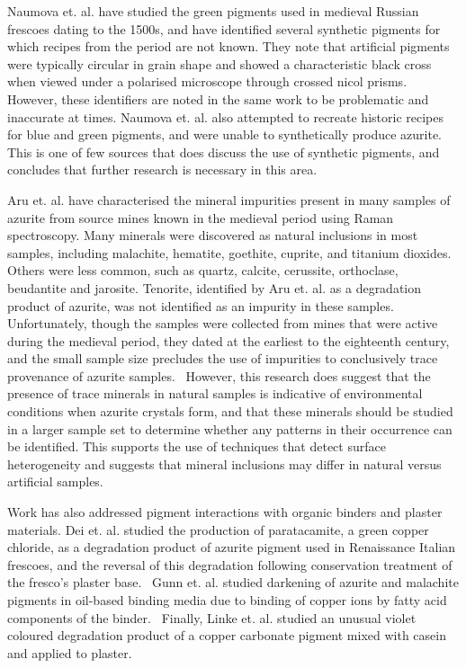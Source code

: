 Naumova et. al. have studied the green pigments used in medieval Russian frescoes dating to the 1500s, and have identified several synthetic pigments for which recipes from the period are not known. They note that artificial pigments were typically circular in grain shape and showed a characteristic black cross when viewed under a polarised microscope through crossed nicol prisms. However, these identifiers are noted in the same work to be problematic and inaccurate at times. Naumova et. al. also attempted to recreate historic recipes for blue and green pigments, and were unable to synthetically produce azurite. This is one of few sources that does discuss the use of synthetic pigments, and concludes that further research is necessary in this area.~\autocite{Naumova1994,Naumova1990}

Aru et. al. have characterised the mineral impurities present in many samples of azurite from source mines known in the medieval period using Raman spectroscopy. Many minerals were discovered as natural inclusions in most samples, including malachite, hematite, goethite, cuprite, and titanium dioxides. Others were less common, such as quartz, calcite, cerussite, orthoclase, beudantite and jarosite. Tenorite, identified by Aru et. al. as a degradation product of azurite, was not identified as an impurity in these samples. Unfortunately, though the samples were collected from mines that were active during the medieval period, they dated at the earliest to the eighteenth century, and the small sample size precludes the use of impurities to conclusively trace provenance of azurite samples.~\autocite{Aru} However, this research does suggest that the presence of trace minerals in natural samples is indicative of environmental conditions when azurite crystals form, and that these minerals should be studied in a larger sample set to determine whether any patterns in their occurrence can be identified. This supports the use of techniques that detect surface heterogeneity and suggests that mineral inclusions may differ in natural versus artificial samples.


Work has also addressed pigment interactions with organic binders and plaster materials. Dei et. al. studied the production of paratacamite, a green copper chloride, as a degradation product of azurite pigment used in Renaissance Italian frescoes, and the reversal of this degradation following conservation treatment of the fresco's plaster base.~\autocite{Dei} Gunn et. al. studied darkening of azurite and malachite pigments in oil-based binding media due to binding of copper ions by fatty acid components of the binder.~\autocite{Gunn} Finally, Linke et. al. studied an unusual violet coloured degradation product of a copper carbonate pigment mixed with casein and applied to plaster.~\autocite{Linke}



